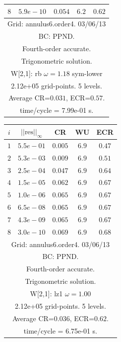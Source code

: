 \begin{table}[hbt]
\begin{center}
{\begin{tabular}{|c|c|c|c|c|}
 $ 8$  & $ 5.9e-10$ & $0.054$ & $ 6.2$ & $0.62$ \\ 
\hline 
\multicolumn{5}{|c|}{Grid: annulus6.order4. 03/06/13}  \\
\multicolumn{5}{|c|}{BC: PPND.}  \\
\multicolumn{5}{|c|}{Fourth-order accurate.}  \\
\multicolumn{5}{|c|}{Trigonometric solution.}  \\
\multicolumn{5}{|c|}{W[2,1]: rb $\omega=1.18$ sym-lower}  \\
\multicolumn{5}{|c|}{2.12e+05 grid-points. 5 levels.}  \\
\multicolumn{5}{|c|}{Average CR=$0.031$, ECR=$0.57$.}  \\
\multicolumn{5}{|c|}{time/cycle = 7.99e-01 s.}  \\
\hline 
\end{tabular}
\begin{tabular}{|c|c|c|c|c|} \hline 
 $i$   & $\vert\vert\mbox{res}\vert\vert_\infty$  &  CR     &  WU    & ECR  \\   \hline 
 $ 1$  & $ 5.5e-01$ & $0.005$ & $ 6.9$ & $0.47$ \\ 
 $ 2$  & $ 5.3e-03$ & $0.009$ & $ 6.9$ & $0.51$ \\ 
 $ 3$  & $ 2.5e-04$ & $0.047$ & $ 6.9$ & $0.64$ \\ 
 $ 4$  & $ 1.5e-05$ & $0.062$ & $ 6.9$ & $0.67$ \\ 
 $ 5$  & $ 1.0e-06$ & $0.065$ & $ 6.9$ & $0.67$ \\ 
 $ 6$  & $ 6.5e-08$ & $0.065$ & $ 6.9$ & $0.67$ \\ 
 $ 7$  & $ 4.3e-09$ & $0.065$ & $ 6.9$ & $0.67$ \\ 
 $ 8$  & $ 3.0e-10$ & $0.069$ & $ 6.9$ & $0.68$ \\ 
\hline 
\multicolumn{5}{|c|}{Grid: annulus6.order4. 03/06/13}  \\
\multicolumn{5}{|c|}{BC: PPND.}  \\
\multicolumn{5}{|c|}{Fourth-order accurate.}  \\
\multicolumn{5}{|c|}{Trigonometric solution.}  \\
\multicolumn{5}{|c|}{W[2,1]: lz1 $\omega=1.00$}  \\
\multicolumn{5}{|c|}{2.12e+05 grid-points. 5 levels.}  \\
\multicolumn{5}{|c|}{Average CR=$0.036$, ECR=$0.62$.}  \\
\multicolumn{5}{|c|}{time/cycle = 6.75e-01 s.}  \\
\hline 
\end{tabular}
}
\end{center}
\end{table}
